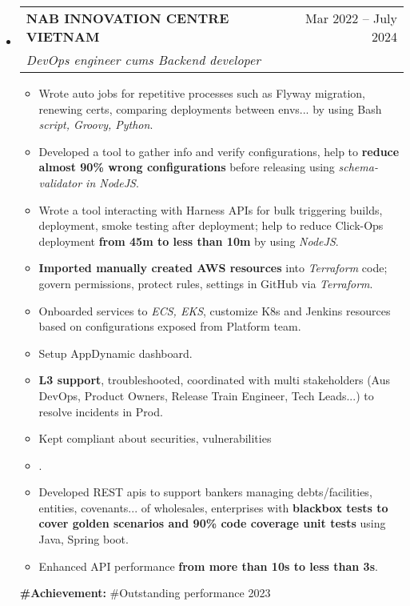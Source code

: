 \documentclass[letterpaper,12pt]{article}[leftmargin=*]
\makeatletter
\def \entryspacing {5pt}
\newcommand{\resumeEntryStart}{\begin{itemize}[leftmargin=2.5mm]}
\newcommand{\resumeEntryEnd}{\end{itemize}\vspace{\entryspacing}}
\newcommand{\resumeItemListStart}{\begin{itemize}[leftmargin=4.5mm]}
\newcommand{\resumeItemListEnd}{\end{itemize}}
\newcommand{\resumeItem}[1]{
  \item\small{
    {#1 \vspace{-2pt}}
  }
}
\newcommand{\resumeEntryTSDL}[4]{
  \vspace{-1pt}\item[]
    \begin{tabularx}{0.97\textwidth}{X@{\hspace{60pt}}r}
      \textbf{\color{primary}#1} & {\firabook\color{accent}\small#2} \\
      \textit{\color{accent}\small#3} & {\firabook\color{accent}\small#4} \\
    \end{tabularx}\vspace{-6pt}
}
\makeatother
\begin{document}
  \resumeEntryStart
    \resumeEntryTSDL
      {NAB INNOVATION CENTRE VIETNAM}{Mar 2022 -- July 2024}
      {DevOps engineer cums Backend developer}{}
    \resumeItemListStart
      \resumeItem {Wrote auto jobs for repetitive processes such as Flyway migration, renewing certs, comparing deployments between envs... by using Bash \textit{script, Groovy, Python}.}
      \resumeItem {Developed a tool to gather info and verify configurations, help to \textbf{reduce almost 90\% wrong configurations} before releasing using \textit{schema-validator in NodeJS}.}
      \resumeItem {Wrote a tool interacting with Harness APIs for bulk triggering builds, deployment, smoke testing after deployment; help to reduce Click-Ops deployment \textbf{from 45m to less than 10m} by using \textit{NodeJS}.}
      \resumeItem {\textbf{Imported manually created AWS resources} into \textit{Terraform} code; govern permissions, protect rules, settings in GitHub via \textit{Terraform}.}
      \resumeItem {Onboarded services to \textit{ECS, EKS}, customize K8s and Jenkins resources based on configurations exposed from Platform team.}
      \resumeItem {Setup AppDynamic dashboard.}
      \resumeItem {\textbf{L3 support}, troubleshooted, coordinated with multi stakeholders (Aus DevOps, Product Owners, Release Train Engineer, Tech Leads...) to resolve incidents in Prod.}
      \resumeItem {Kept compliant about securities, vulnerabilities}
      \vspace{1pt}\small{
      }\vspace{-1pt}
      \resumeItem {.}
      \vspace{-10pt}\resumeItem {Developed REST apis to support bankers managing debts/facilities, entities, covenants... of wholesales, enterprises with \textbf{blackbox tests to cover golden scenarios and 90\% code coverage unit tests} using Java, Spring boot.}
      \resumeItem {Enhanced API performance \textbf{from more than 10s to less than 3s}.}
    \resumeItemListEnd
    \textbf{\color{primary}\small#Achievement: }{\small#Outstanding performance 2023}
  \resumeEntryEnd
\end{document}
